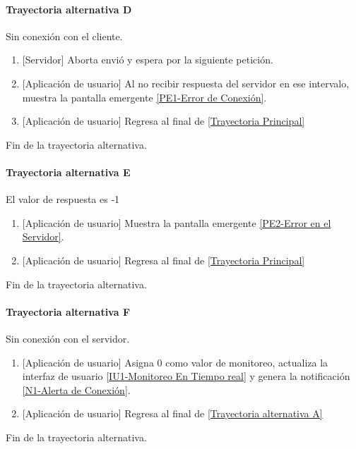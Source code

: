 \paragraph{Trayectoria alternativa D} \label{SUB-M-CU5:TD}
	Sin conexión con el cliente.
	\begin{enumerate}[label=D\arabic*.]
		\item {[Servidor]} Aborta envió y espera por la siguiente petición.
		\item {[Aplicación de usuario]} Al no recibir respuesta del servidor en ese intervalo, muestra la pantalla emergente \hyperref[fig:Error de Conexion]{[PE1-Error de Conexión]}.
		\item {[Aplicación de usuario]} Regresa al final de \hyperref[SUB-M-CU5:TP]{[Trayectoria Principal]}
	\end{enumerate}
	Fin de la trayectoria alternativa.
	
\paragraph{Trayectoria alternativa E} \label{SUB-M-CU5:TE}
	El valor de respuesta es -1
	\begin{enumerate}[label=E\arabic*.]
		\item {[Aplicación de usuario]} Muestra la pantalla emergente \hyperref[fig:Error en el Servidor]{[PE2-Error en el Servidor]}.
		\item {[Aplicación de usuario]} Regresa al final de \hyperref[SUB-M-CU5:TP]{[Trayectoria Principal]}
	\end{enumerate}
	Fin de la trayectoria alternativa.
	
\paragraph{Trayectoria alternativa F} \label{SUB-M-CU5:TF}
	Sin conexión con el servidor.
	\begin{enumerate}[label=F\arabic*.]
		\item {[Aplicación de usuario]} Asigna 0 como valor de monitoreo, actualiza la interfaz de usuario \hyperref[fig:monitoreo]{[IU1-Monitoreo En Tiempo real]}  y genera la notificación \hyperref[fig:Alerta Conexion]{[N1-Alerta de Conexión]}.
		\item {[Aplicación de usuario]} Regresa al final de \hyperref[SUB-M-CU5:TA]{[Trayectoria alternativa A]}
	\end{enumerate}
	Fin de la trayectoria alternativa.
	
